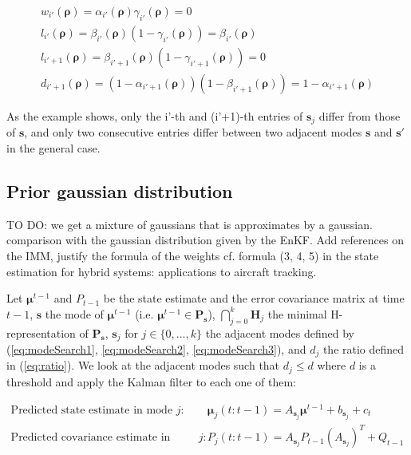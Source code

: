 \documentclass[11pt]{article}
\numberwithin{equation}{section}
\numberwithin{figure}{section}
\numberwithin{table}{section}
\begin{document}
\begin{equation}
\begin{array}{l}
w_{i'}(\boldsymbol\rho)=\alpha_{i'}(\boldsymbol\rho)\gamma_{i'}(\boldsymbol\rho)=0\\
l_{i'}(\boldsymbol\rho)=\beta_{i'}(\boldsymbol\rho)(1-\gamma_{i'}(\boldsymbol\rho))=\beta_{i'}(\boldsymbol\rho)\\
l_{i'+1}(\boldsymbol\rho)=\beta_{i'+1}(\boldsymbol\rho)(1-\gamma_{i'+1}(\boldsymbol\rho))=0\\
d_{i'+1}(\boldsymbol\rho)=(1-\alpha_{i'+1}(\boldsymbol\rho))(1-\beta_{i'+1}(\boldsymbol\rho))=1-\alpha_{i'+1}(\boldsymbol\rho)
\end{array}
\label{eq:modeSearch8}
\end{equation}

As the example shows, only the i'-th and (i'+1)-th entries of $\boldsymbol s_{j}$ differ from those of $\boldsymbol s$, and only two consecutive entries differ between two adjacent modes $\boldsymbol s$ and $\boldsymbol s'$ in the general case.


\subsection{Prior gaussian distribution}

TO DO: we get a mixture of gaussians that is approximates by a gaussian. comparison with the gaussian distribution given by the EnKF. Add references on the IMM, justify the formula of the weights cf. formula (3, 4, 5) in the state estimation for hybrid systems: applications to aircraft tracking.

Let $\boldsymbol\mu^{t-1}$ and $P_{t-1}$ be the state estimate and the error covariance matrix at time $t-1$, $\boldsymbol s$ the mode of $\boldsymbol\mu^{t-1}$ (i.e. $\boldsymbol\mu^{t-1}\in \textbf{P}_{\boldsymbol s}$), $\bigcap_{j=0}^{k} \textbf{H}_{j}$ the minimal H-representation of $\textbf{P}_{\boldsymbol s}$, $\boldsymbol s_{j}$ for $j\in\{0,...,k\}$ the adjacent modes defined by (\ref{eq:modeSearch1}, \ref{eq:modeSearch2}, \ref{eq:modeSearch3}), and $d_{j}$ the ratio defined in (\ref{eq:ratio}). We look at the adjacent modes such that $d_{j}\leq d$ where $d$ is a threshold and apply the Kalman filter to each one of them:

\begin{equation}
\begin{array}{ll}
\text{Predicted state estimate in mode $j$: } & \boldsymbol\mu_{j}(t:t-1) = A_{\boldsymbol s_{j}} \boldsymbol\mu^{t-1} + b_{\boldsymbol s_{j}} + c_{t}\\
\text{Predicted covariance estimate in mode $j$: } & P_{j}(t:t-1) = A_{\boldsymbol s_{j}}P_{t-1}(A_{\boldsymbol s_{j}})^{T} + Q_{t-1}
\end{array}
\label{eq:mixture1}
\end{equation}
\end{document}
